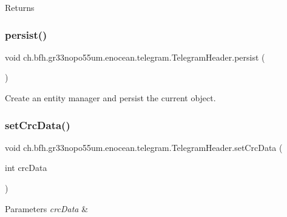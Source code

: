 \begin{DoxyReturn}{Returns}

\end{DoxyReturn}
\hypertarget{classch_1_1bfh_1_1gr33nopo55um_1_1enocean_1_1telegram_1_1_telegram_header_aa66a49f7ecb9ee5ea4e768f7ca7e2ac2}{}\label{classch_1_1bfh_1_1gr33nopo55um_1_1enocean_1_1telegram_1_1_telegram_header_aa66a49f7ecb9ee5ea4e768f7ca7e2ac2} 
\subsubsection{\texorpdfstring{persist()}{persist()}}
{\footnotesize\ttfamily void ch.\+bfh.\+gr33nopo55um.\+enocean.\+telegram.\+Telegram\+Header.\+persist (\begin{DoxyParamCaption}{ }\end{DoxyParamCaption})}

Create an entity manager and persist the current object. \hypertarget{classch_1_1bfh_1_1gr33nopo55um_1_1enocean_1_1telegram_1_1_telegram_header_ab69b9adbda2c4911d8d7ab02e3e275e9}{}\label{classch_1_1bfh_1_1gr33nopo55um_1_1enocean_1_1telegram_1_1_telegram_header_ab69b9adbda2c4911d8d7ab02e3e275e9} 
\subsubsection{\texorpdfstring{set\+Crc\+Data()}{setCrcData()}}
{\footnotesize\ttfamily void ch.\+bfh.\+gr33nopo55um.\+enocean.\+telegram.\+Telegram\+Header.\+set\+Crc\+Data (\begin{DoxyParamCaption}\item[{int}]{crc\+Data }\end{DoxyParamCaption})}


\begin{DoxyParams}{Parameters}
{\em crc\+Data} & \\
\hline
\end{DoxyParams}
\hypertarget{classch_1_1bfh_1_1gr33nopo55um_1_1enocean_1_1telegram_1_1_telegram_header_a482eb2b68615cfdc688228ae1f1faf6d}{}\label{classch_1_1bfh_1_1gr33nopo55um_1_1enocean_1_1telegram_1_1_telegram_header_a482eb2b68615cfdc688228ae1f1faf6d} 
